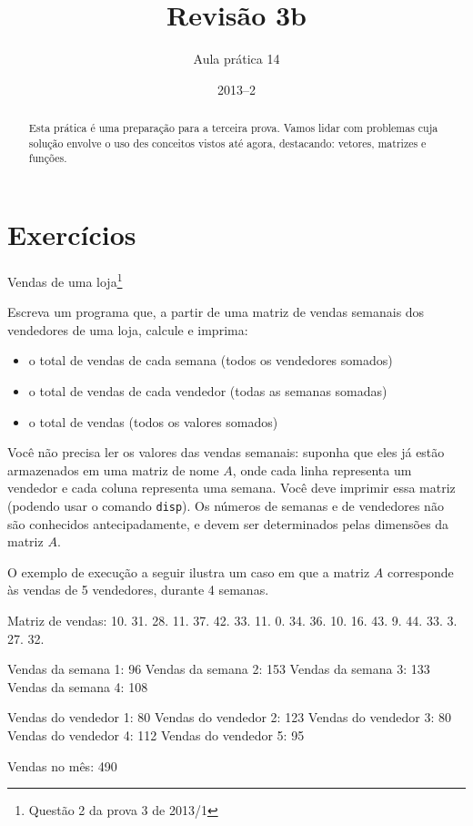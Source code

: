 \documentclass[11pt]{practice}
\begin{document}
\subtitle{Aula prática 14}
\title{Revisão 3b}
\author{}
\date{2013--2}
\maketitle

\begin{abstract}
  Esta prática é uma preparação para a terceira prova. Vamos lidar com
  problemas cuja solução envolve o uso des conceitos vistos até agora,
  destacando: vetores, matrizes e funções.
\end{abstract}


\section{Exercícios}

\begin{task}[breakable]{Vendas de uma loja\footnote{Questão 2 da prova 3 de 2013/1}}{}

  Escreva um programa que, a partir de uma matriz de vendas semanais dos
  vendedores de uma loja, calcule e imprima:
  \begin{itemize}
    \item o total de vendas de cada semana (todos os vendedores somados)
    \item o total de vendas de cada vendedor (todas as semanas somadas)
    \item o total de vendas (todos os valores somados)
  \end{itemize}

  Você não precisa ler os valores das vendas semanais: suponha que eles
  já estão armazenados em uma matriz de nome $A$, onde cada linha
  representa um vendedor e cada coluna representa uma semana. Você deve
  imprimir essa matriz (podendo usar o comando \texttt{disp}). Os
  números de semanas e de vendedores não são conhecidos antecipadamente,
  e devem ser determinados pelas dimensões da matriz $A$.

  O exemplo de execução a seguir ilustra um caso em que a matriz $A$
  corresponde às vendas de 5 vendedores, durante 4 semanas.

  \begin{runexample}
Matriz de vendas: 
    10.    31.    28.    11.  
    37.    42.    33.    11.  
    0.     34.    36.    10.  
    16.    43.    9.     44.  
    33.    3.     27.    32.  

Vendas da semana 1: 96
Vendas da semana 2: 153
Vendas da semana 3: 133
Vendas da semana 4: 108

Vendas do vendedor 1: 80
Vendas do vendedor 2: 123
Vendas do vendedor 3: 80
Vendas do vendedor 4: 112
Vendas do vendedor 5: 95

Vendas no mês: 490
  \end{runexample}

  \tcblower
  \solution
\end{task}
\end{document}
